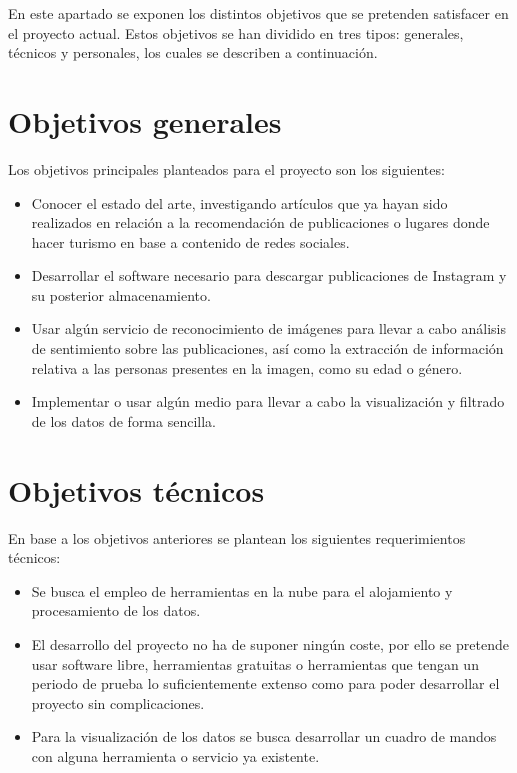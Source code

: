 
En este apartado se exponen los distintos objetivos que se pretenden satisfacer en el proyecto actual. Estos objetivos se han dividido en tres tipos: generales, técnicos y personales, los cuales se describen a continuación.

\section{Objetivos generales}

Los objetivos principales planteados para el proyecto son los siguientes:

\begin{itemize}
    \item Conocer el estado del arte, investigando artículos que ya hayan sido realizados en relación a la recomendación de publicaciones o lugares donde hacer turismo en base a contenido de redes sociales.
    \item Desarrollar el software necesario para descargar publicaciones de Instagram y su posterior almacenamiento.
    \item Usar algún servicio de reconocimiento de imágenes para llevar a cabo análisis de sentimiento sobre las publicaciones, así como la extracción de información relativa a las personas presentes en la imagen, como su edad o género.
    \item Implementar o usar algún medio para llevar a cabo la visualización y filtrado de los datos de forma sencilla.
\end{itemize}

\section{Objetivos técnicos}

En base a los objetivos anteriores se plantean los siguientes requerimientos técnicos:

\begin{itemize}
    \item Se busca el empleo de herramientas en la nube para el alojamiento y procesamiento de los datos.
    \item El desarrollo del proyecto no ha de suponer ningún coste, por ello se pretende usar software libre, herramientas gratuitas o herramientas que tengan un periodo de prueba lo suficientemente extenso como para poder desarrollar el proyecto sin complicaciones.
    \item Para la visualización de los datos se busca desarrollar un cuadro de mandos con alguna herramienta o servicio ya existente.
\end{itemize}

